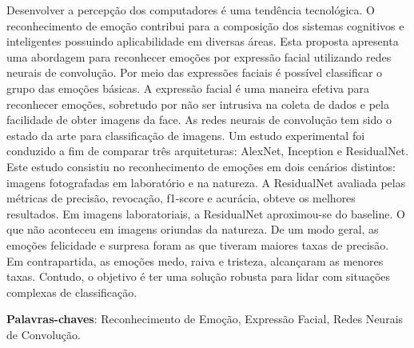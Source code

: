 \documentclass[oldfontcommands,12pt,openright,twoside,a4paper,brazil]{abntex2}
\begin{document}

\begin{resumo}
Desenvolver a percepção dos computadores é uma tendência tecnológica. O reconhecimento de emoção contribui para a composição dos sistemas cognitivos e inteligentes possuindo aplicabilidade em diversas áreas. Esta proposta apresenta uma abordagem para reconhecer emoções por expressão facial utilizando redes neurais de convolução. Por meio das expressões faciais é possível classificar o grupo das emoções básicas. A expressão facial é uma maneira efetiva para reconhecer emoções, sobretudo por não ser intrusiva na coleta de dados e pela facilidade de obter imagens da face. As redes neurais de convolução tem sido o estado da arte para classificação de imagens. Um estudo experimental foi conduzido a fim de comparar três arquiteturas: AlexNet, Inception e ResidualNet.  Este estudo consistiu no reconhecimento de emoções em dois cenários distintos: imagens fotografadas em laboratório e na natureza. A ResidualNet avaliada pelas métricas de precisão, revocação, f1-score e acurácia, obteve os melhores resultados. Em imagens laboratoriais, a ResidualNet aproximou-se do baseline. O que não aconteceu em imagens oriundas da natureza. De um modo geral, as emoções felicidade e surpresa foram as que tiveram maiores taxas de precisão. Em contrapartida, as emoções medo, raiva e tristeza, alcançaram as menores taxas.  Contudo, o objetivo é ter uma solução robusta para lidar com situações complexas de classificação.  





   \vspace{\onelineskip}
 
   \noindent 
   \textbf{Palavras-chaves}: Reconhecimento de Emoção, Expressão Facial, Redes Neurais de Convolução.
\end{resumo}


\listoffigures*
\cleardoublepage

\listoftables*
\cleardoublepage
\end{document}
